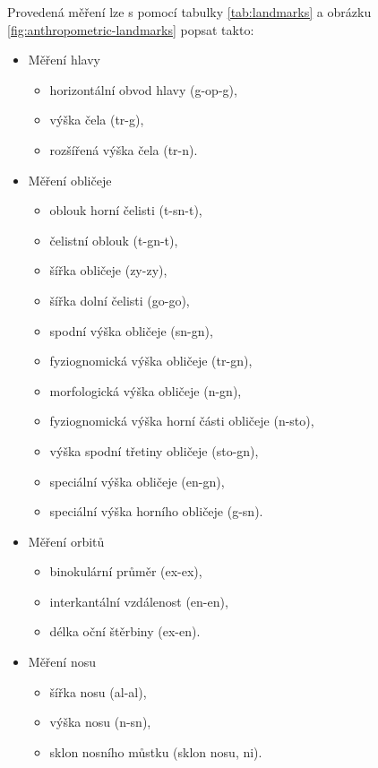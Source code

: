 Provedená měření \cite{Zacharopoulos2016} lze s pomocí tabulky \ref{tab:landmarks} a obrázku \ref{fig:anthropometric-landmarks} popsat takto:

\begin{itemize}
    \item Měření hlavy
        \begin{itemize}
            \item horizontální obvod hlavy (g-op-g),
            \item výška čela (tr-g),
            \item rozšířená výška čela (tr-n).
        \end{itemize}
    \item Měření obličeje
    \begin{itemize}
        \item oblouk horní čelisti (t-sn-t),
        \item čelistní oblouk (t-gn-t),
        \item šířka obličeje (zy-zy),
        \item šířka dolní čelisti (go-go),
        \item spodní výška obličeje (sn-gn),
        \item fyziognomická výška obličeje (tr-gn),
        \item morfologická výška obličeje (n-gn),
        \item fyziognomická výška horní části obličeje (n-sto),
        \item výška spodní třetiny obličeje (sto-gn),
        \item speciální výška obličeje (en-gn),
        \item speciální výška horního obličeje (g-sn).
    \end{itemize}
    \item Měření orbitů
    \begin{itemize}
        \item binokulární průměr (ex-ex),
        \item interkantální vzdálenost (en-en),
        \item délka oční štěrbiny (ex-en).
    \end{itemize}
    \item Měření nosu
    \begin{itemize}
        \item šířka nosu (al-al),
        \item výška nosu (n-sn),
        \item sklon nosního můstku (sklon nosu, ni).

\end{itemize}
\end{itemize}
